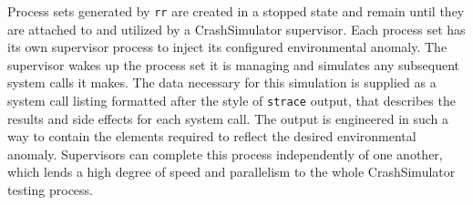 Process sets generated by {\tt rr} are created in a stopped state and
remain until they are attached to and utilized by a CrashSimulator
supervisor.  Each process set has its own supervisor process to inject
its configured environmental anomaly.  The
supervisor wakes up the process set it is managing and simulates any
subsequent system calls it makes.  The data necessary for this
simulation is
supplied as a system call listing formatted after the style of {\tt strace}
output, that describes the results and side effects for each system
call. The output is engineered in such a way to contain the
elements required to reflect the
desired environmental anomaly.  Supervisors can complete this
process independently of one another, which lends a
high degree of speed and
parallelism to the whole CrashSimulator testing process.
